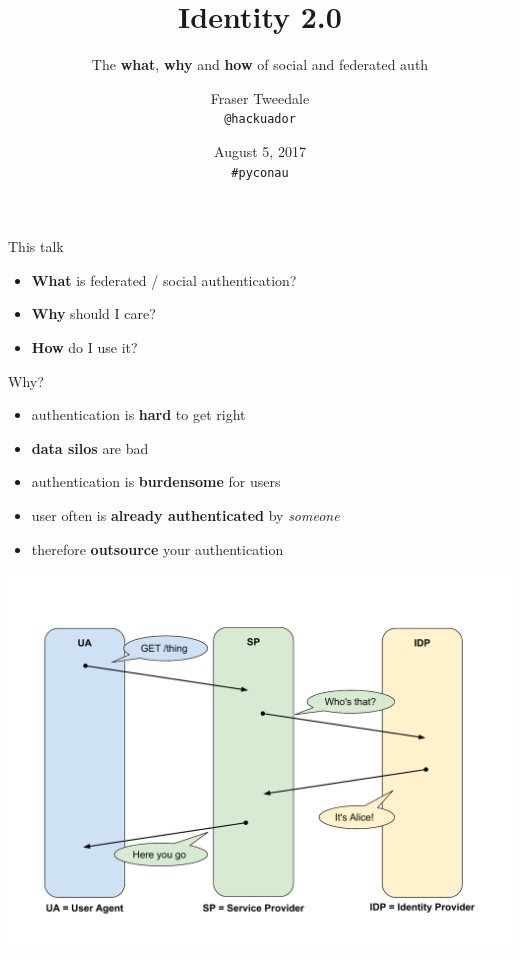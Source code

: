 \documentclass[ignorenonframetext,aspectratio=169]{beamer}
\title{\textbf{Identity 2.0}}
\subtitle{The {\bf what}, {\bf why} and {\bf how} of social and federated auth}
\author{Fraser Tweedale\\\texttt{@hackuador}}
\date{August 5, 2017\\{\tt \#pyconau}}
\institute{}
\providecommand{\tightlist}{%
  \setlength{\itemsep}{0pt}\setlength{\parskip}{0pt}}
\begin{document}
\frame[plain]{\titlepage}

\begin{frame}{This talk}

\begin{itemize}
\tightlist
\item \textbf{What} is federated / social authentication?
\item \textbf{Why} should I care?
\item \textbf{How} do I use it?
\end{itemize}

\end{frame}

\begin{frame}{Why?}

\begin{itemize}
\tightlist
\item authentication is {\bf hard} to get right
\item {\bf data silos} are bad
\item authentication is {\bf burdensome} for users
\item user often is {\bf already authenticated} by {\em someone}
\item therefore \textbf{outsource} your authentication
\end{itemize}

\end{frame}

\begin{frame}[plain]
\centering
\includegraphics[height=\paperheight]{fedsso-basic.pdf}
\end{frame}
\end{document}
